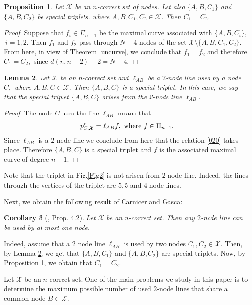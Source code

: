 \documentclass[a4paper,12pt]{article}
\newtheorem{lemma}{Lemma}[section]
\newtheorem{proposition}[lemma]{Proposition}
\newtheorem{corollary}[lemma]{Corollary}
\theoremstyle{definition}
\numberwithin{equation}{section}
\numberwithin{figure}{section}
\newcommand{\Xset}{\mathcal{X}}
\begin{document}
\begin{proposition} \label{sptr2} Let $\Xset$ be an $n$-correct set of nodes. Let also $\{A,B,C_1\}$ and $\{A,B,C_2\}$ be special triplets, where $A,B,C_1,C_2 \in\Xset$. Then $C_1=C_2.$
\end{proposition}
\begin{proof} Suppose that $f_i\in\Pi_{n-1}$ be the maximal curve associated with $\{A,B,C_i\},$  $\ i=1,2.$ Then $f_1$ and $f_2$ pass through $N-4$ nodes of the set
$\Xset\setminus \{A,B,C_1,C_2\}.$ From here, in view of Theorem \ref{uncurve}, we conclude that $f_1= f_2$ and therefore $C_1=C_2,$ since $d(n,n-2)+2=N-4.$

\end{proof}
\begin{lemma}\label{cor:2ket}
Let $\Xset$ be an $n$-correct set and $\ell_{AB}$ be a $2$-node line used by a node $C,$ where $A, B,C\in\Xset.$ Then $\{A,B,C\}$ is a special triplet. 
In this case, we say that the special triplet $\{A, B, C\}$ arises from the 2-node line $\ell_{AB}.$
\end{lemma}
\begin{proof}
The node $C$ uses the  line $\ell_{AB}$ means that
\begin{equation}\label{01}p^\star_{C,\Xset}=\ell_{AB} f,\ \hbox{where}\  f\in\Pi_{n-1}.
\end{equation}
Since $\ell_{AB}$ is a $2$-node line we conclude from here that the relation \eqref{020} takes place. Therefore $\{A,B,C\}$ is a special triplet and $f$ is the associated maximal curve of degree $n-1$.
\end{proof}
Note that the triplet in Fig.\ref{Fig2} is not arisen from $2$-node line. Indeed, the lines through the vertices of the triplet are $5,5$ and $4$-node lines.

Next, we obtain the following result of Carnicer and Gasca:
\begin{corollary}[\cite{CG03}, Prop. 4.2] \label{2nodeuse} Let $\Xset$ be an $n$-correct set. Then any $2$-node line can be used by at most one node.
\end{corollary}
Indeed, assume that a $2$ node line $\ell_{AB}$ is used by two nodes $C_1,C_2\in\Xset.$ Then, by Lemma \ref{cor:2ket}, we get that $\{A,B,C_1\}$ and $\{A,B,C_2\}$ are special triplets. Now, by  Proposition \ref{sptr2}, we obtain that $C_1=C_2.$ 



Let $\Xset$ be an $n$-correct set.
One of the main problems we study in this paper is to determine the maximum possible number of used $2$-node lines that share a common node $B \in \mathcal{X}$.
\end{document}
